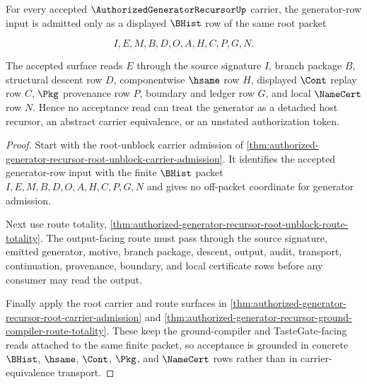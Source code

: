 \begin{theorem}
\label{thm:authorized-generator-recursor-grounded-acceptance-surface}
For every accepted $\AuthorizedGeneratorRecursorUp$ carrier, the generator-row input is admitted only as a displayed $\BHist$ row of the same root packet

$$
I,E,M,B,D,O,A,H,C,P,G,N.
$$

The accepted surface reads $E$ through the source signature $I$, branch package $B$, structural descent row $D$, componentwise $\hsame$ row $H$, displayed $\Cont$ replay row $C$, $\Pkg$ provenance row $P$, boundary and ledger row $G$, and local $\NameCert$ row $N$. Hence no acceptance read can treat the generator as a detached host recursor, an abstract carrier equivalence, or an unstated authorization token.
\end{theorem}
\begin{proof}
Start with the root-unblock carrier admission of \autoref{thm:authorized-generator-recursor-root-unblock-carrier-admission}. It identifies the accepted generator-row input with the finite $\BHist$ packet $I,E,M,B,D,O,A,H,C,P,G,N$ and gives no off-packet coordinate for generator admission.

Next use route totality, \autoref{thm:authorized-generator-recursor-root-unblock-route-totality}. The output-facing route must pass through the source signature, emitted generator, motive, branch package, descent, output, audit, transport, continuation, provenance, boundary, and local certificate rows before any consumer may read the output.

Finally apply the root carrier and route surfaces in \autoref{thm:authorized-generator-recursor-root-carrier-admission} and \autoref{thm:authorized-generator-recursor-ground-compiler-route-totality}. These keep the ground-compiler and TasteGate-facing reads attached to the same finite packet, so acceptance is grounded in concrete $\BHist$, $\hsame$, $\Cont$, $\Pkg$, and $\NameCert$ rows rather than in carrier-equivalence transport.
\end{proof}

